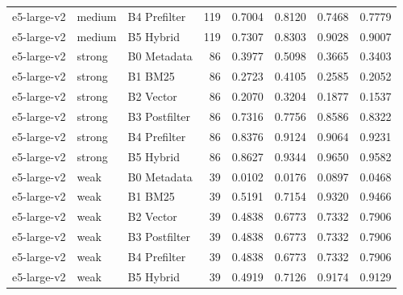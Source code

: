 \begin{tabular}{lllrllll}
e5-large-v2 & medium & B4 Prefilter & 119 & 0.7004 & 0.8120 & 0.7468 & 0.7779 \\
e5-large-v2 & medium & B5 Hybrid & 119 & 0.7307 & 0.8303 & 0.9028 & 0.9007 \\
e5-large-v2 & strong & B0 Metadata & 86 & 0.3977 & 0.5098 & 0.3665 & 0.3403 \\
e5-large-v2 & strong & B1 BM25 & 86 & 0.2723 & 0.4105 & 0.2585 & 0.2052 \\
e5-large-v2 & strong & B2 Vector & 86 & 0.2070 & 0.3204 & 0.1877 & 0.1537 \\
e5-large-v2 & strong & B3 Postfilter & 86 & 0.7316 & 0.7756 & 0.8586 & 0.8322 \\
e5-large-v2 & strong & B4 Prefilter & 86 & 0.8376 & 0.9124 & 0.9064 & 0.9231 \\
e5-large-v2 & strong & B5 Hybrid & 86 & 0.8627 & 0.9344 & 0.9650 & 0.9582 \\
e5-large-v2 & weak & B0 Metadata & 39 & 0.0102 & 0.0176 & 0.0897 & 0.0468 \\
e5-large-v2 & weak & B1 BM25 & 39 & 0.5191 & 0.7154 & 0.9320 & 0.9466 \\
e5-large-v2 & weak & B2 Vector & 39 & 0.4838 & 0.6773 & 0.7332 & 0.7906 \\
e5-large-v2 & weak & B3 Postfilter & 39 & 0.4838 & 0.6773 & 0.7332 & 0.7906 \\
e5-large-v2 & weak & B4 Prefilter & 39 & 0.4838 & 0.6773 & 0.7332 & 0.7906 \\
e5-large-v2 & weak & B5 Hybrid & 39 & 0.4919 & 0.7126 & 0.9174 & 0.9129 \\
\bottomrule
\end{tabular}
